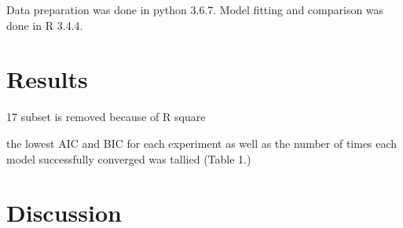 \documentclass[a4paper,11pt]{article}
\theoremstyle{definition}
\begin{document}
Data preparation was done in python 3.6.7. Model fitting and comparison was done in R 3.4.4. 

\section{Results}
17 subset is removed because of R square

the lowest AIC and BIC for each experiment as well as the number of times each model successfully converged was tallied (Table 1.)



\section{Discussion}

\appendix




  
\end{document}
